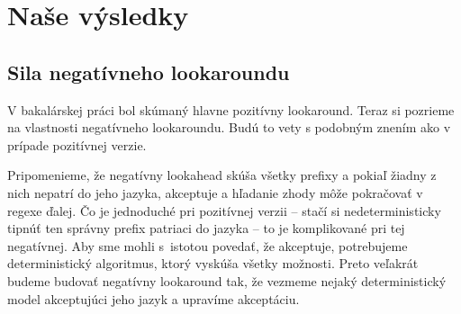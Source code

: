 \chapter{Naše výsledky}
\label{chap:vysledky}

\section{Sila negatívneho lookaroundu}

V bakalárskej práci bol skúmaný hlavne pozitívny lookaround. Teraz si pozrieme na vlastnosti negatívneho lookaroundu. Budú to vety s podobným znením ako v prípade pozitívnej verzie. 

Pripomenieme, že negatívny lookahead skúša všetky prefixy a pokiaľ žiadny z nich nepatrí do jeho jazyka, akceptuje a hľadanie zhody môže pokračovať v regexe ďalej. Čo je jednoduché pri pozitívnej verzii -- stačí si nedeterministicky tipnúť ten správny prefix patriaci do jazyka -- to je komplikované pri tej negatívnej. Aby sme mohli s~istotou povedať, že akceptuje, potrebujeme deterministický algoritmus, ktorý vyskúša všetky možnosti. Preto veľakrát budeme budovať negatívny lookaround tak, že vezmeme nejaký deterministický model akceptujúci jeho jazyk a upravíme akceptáciu.

